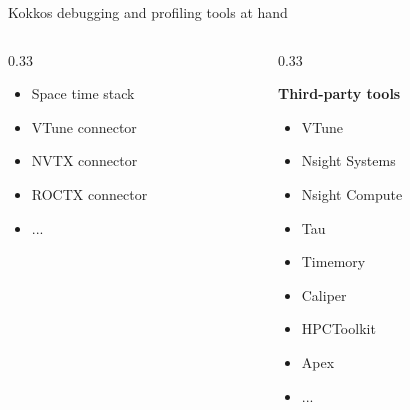 \documentclass[
    aspectratio=169,
    \createHandout
]{beamer}
\begin{document}
\begin{frame}{Kokkos debugging and profiling tools at hand}
\begin{columns}[T]
\begin{column}{0.33\linewidth}
\begin{itemize}
                \item Space time stack
                \item VTune connector
                \item NVTX connector
                \item ROCTX connector
                \item ...
            \end{itemize}
        \end{column}
        \pause
        \begin{column}{0.33\linewidth}
            \begin{center}
                \textbf{Third-party tools}
            \end{center}
            \begin{itemize}
                \item VTune
                \item Nsight Systems
                \item Nsight Compute
                \item Tau
                \item Timemory
                \item Caliper
                \item HPCToolkit
                \item Apex
                \item ...
            \end{itemize}
        \end{column}
    \end{columns}
\end{frame}
\end{document}
